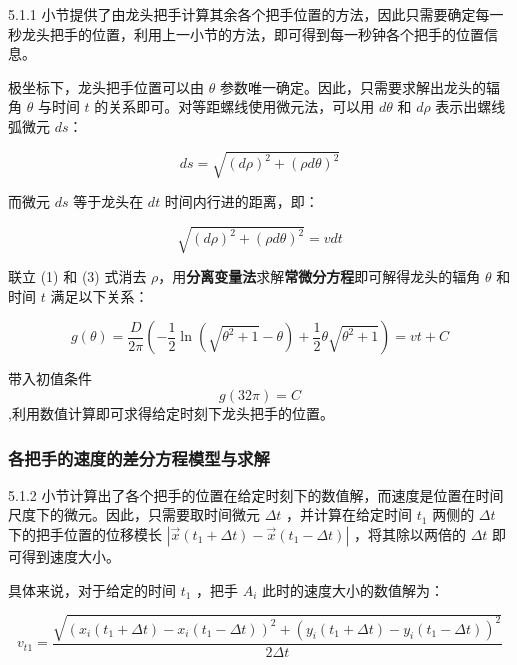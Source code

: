 \documentclass[a4paper]{article}
\begin{document}
		5.1.1 小节提供了由龙头把手计算其余各个把手位置的方法，因此只需要确定每一秒龙头把手的位置，利用上一小节的方法，即可得到每一秒钟各个把手的位置信息。

		极坐标下，龙头把手位置可以由 $\theta$ 参数唯一确定。因此，只需要求解出龙头的辐角 $\theta$ 与时间 $t$ 的关系即可。对等距螺线使用微元法，可以用 $d\theta$ 和 $d\rho$ 表示出螺线弧微元 $ds$：

		$$ ds = \sqrt{(d\rho)^2 + (\rho d\theta) ^ 2}$$

		而微元 $ds$ 等于龙头在 $dt$ 时间内行进的距离，即：

		\begin{equation}
			\sqrt{(d\rho)^2 + (\rho d\theta) ^ 2} = vdt
		\end{equation}

		联立 (1) 和 (3) 式消去 $\rho$，用\textbf{分离变量法}求解\textbf{常微分方程}即可解得龙头的辐角 $\theta$ 和时间 $t$ 满足以下关系：

		\begin{equation}
			g(\theta) = \frac{D}{2\pi}(-\frac{1}{2}\ln(\sqrt{\theta^2+1}-\theta)+\frac{1}{2}\theta\sqrt{\theta^2+1})=vt+C
		\end{equation}


		带入初值条件$$g(32  \pi) = C$$,利用数值计算即可求得给定时刻下龙头把手的位置。

	\subsubsection{各把手的速度的差分方程模型与求解}

		5.1.2 小节计算出了各个把手的位置在给定时刻下的数值解，而速度是位置在时间尺度下的微元。因此，只需要取时间微元 $\Delta t$ ，并计算在给定时间 $t_1$ 两侧的 $\Delta t$ 下的把手位置的位移模长 $|\vec{x}(t_1+\Delta t) - \vec{x}(t_1 - \Delta t)|$ ，将其除以两倍的 $\Delta t$ 即可得到速度大小。



		具体来说，对于给定的时间 $t_1$ ，把手 $A_i$ 此时的速度大小的数值解为：

		\begin{equation}
			v_{t1} = \frac{\sqrt{(x_i(t_1 + \Delta t) - x_i(t_1 - \Delta t))^2 + (y_i(t_1 + \Delta t) - y_i(t_1 - \Delta t))^2}}{2\Delta t}
		\end{equation}

\end{document}
